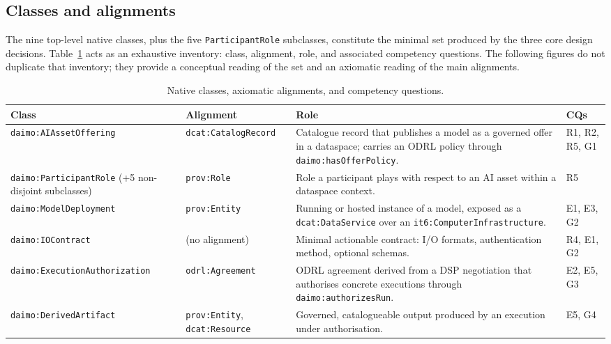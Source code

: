 \documentclass[Afour,sagev,times]{sagej}
\newcommand{\code}[1]{\texttt{#1}}
\begin{document}
\subsection{Classes and alignments}\label{sec:classes}

The nine top-level native classes, plus the five \code{ParticipantRole} subclasses, constitute the minimal set produced by the three core design decisions. Table~\ref{tab:classes} acts as an exhaustive inventory: class, alignment, role, and associated competency questions. The following figures do not duplicate that inventory; they provide a conceptual reading of the set and an axiomatic reading of the main alignments.

\begin{table}[tb]
\scriptsize\sf\centering
\caption{Native classes, axiomatic alignments, and competency questions.\label{tab:classes}}
\begin{tabular}{@{}p{4cm}p{3cm}p{6cm}p{2.2cm}@{}}
\toprule
\textbf{Class} & \textbf{Alignment} & \textbf{Role} & \textbf{CQs} \\
\midrule
\code{daimo:AIAsset}\newline\code{Offering} & \code{dcat:CatalogRecord} & Catalogue record that publishes a model as a governed offer in a dataspace; carries an ODRL policy through \code{daimo:hasOfferPolicy}. & R1, R2, R5, G1 \\
\code{daimo:ParticipantRole} \newline (+5 non-disjoint subclasses) & \code{prov:Role} & Role a participant plays with respect to an AI asset within a dataspace context. & R5 \\
\code{daimo:Model}\newline\code{Deployment} & \code{prov:Entity} & Running or hosted instance of a model, exposed as a \code{dcat:DataService} over an \code{it6:ComputerInfrastructure}. & E1, E3, G2 \\
\code{daimo:IOContract} & (no alignment) & Minimal actionable contract: I/O formats, authentication method, optional schemas. & R4, E1, G2 \\
\code{daimo:Execution}\newline\code{Authorization} & \code{odrl:Agreement} & ODRL agreement derived from a DSP negotiation that authorises concrete executions through \code{daimo:authorizesRun}. & E2, E5, G3 \\
\code{daimo:DerivedArtifact} & \code{prov:Entity}, \code{dcat:Resource} & Governed, catalogueable output produced by an execution under authorisation. & E5, G4 \\

\end{tabular}
\end{table}
\end{document}
